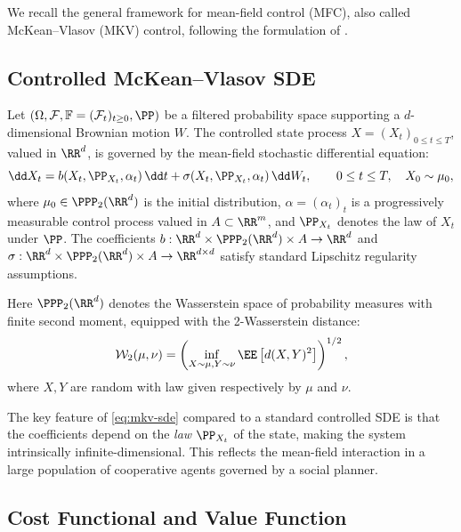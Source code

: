 \documentclass[11pt]{article}
\begin{document}
We recall the general framework for mean-field control (MFC), also called McKean--Vlasov (MKV) control, following the formulation of \citet{pham2024mfnn}.

\subsection{Controlled McKean--Vlasov SDE}

Let $(\Omega, \mathcal{F}, \mathbb{F} = (\mathcal{F}_t)_{t \ge 0}, \PP)$ be a filtered probability space supporting a $d$-dimensional Brownian motion $W$. The controlled state process $X = (X_t)_{0 \le t \le T}$, valued in $\RR^d$, is governed by the mean-field stochastic differential equation:
\begin{equation}\label{eq:mkv-sde}
  \dd X_t = b(X_t, \PP_{X_t}, \alpha_t)\,\dd t + \sigma(X_t, \PP_{X_t}, \alpha_t)\,\dd W_t, \qquad 0 \le t \le T, \quad X_0 \sim \mu_0,
\end{equation}
where $\mu_0 \in \PPP_2(\RR^d)$ is the initial distribution, $\alpha = (\alpha_t)_t$ is a progressively measurable control process valued in $A \subset \RR^m$, and $\PP_{X_t}$ denotes the law of $X_t$ under $\PP$. The coefficients $b : \RR^d \times \PPP_2(\RR^d) \times A \to \RR^d$ and $\sigma : \RR^d \times \PPP_2(\RR^d) \times A \to \RR^{d \times d}$ satisfy standard Lipschitz regularity assumptions.

Here $\PPP_2(\RR^d)$ denotes the Wasserstein space of probability measures with finite second moment, equipped with the 2-Wasserstein distance:
\begin{equation}\label{eq:wasserstein}
  \mathcal{W}_2(\mu, \nu) = \left( \inf_{X \sim \mu, Y \sim \nu} \EE\left[ d(X, Y)^2 \right] \right)^{1/2},
\end{equation}
where $X, Y$ are random with law given respectively by $\mu$ and $\nu$.

\begin{remark}
  The key feature of \eqref{eq:mkv-sde} compared to a standard controlled SDE is that the coefficients depend on the \emph{law} $\PP_{X_t}$ of the state, making the system intrinsically infinite-dimensional. This reflects the mean-field interaction in a large population of cooperative agents governed by a social planner.
\end{remark}

\subsection{Cost Functional and Value Function}
\end{document}
